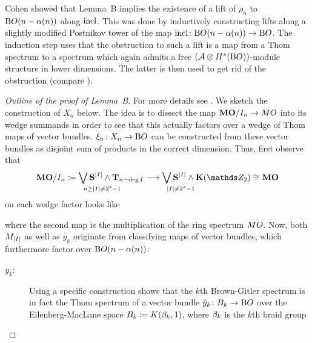 Cohen showed that Lemma~B implies the existence of a lift of $\rho_n$
to $\mathrm{B}O(n-\alpha(n))$ along $\mathrm{incl}$. This was done by inductively
constructing lifts along a slightly modified Postnikov tower of
the map $\mathrm{incl}\colon\mathrm{B}O(n-\alpha(n))\to\mathrm{B}O$.
The induction step uses that the obstruction to such a lift is
a map from a Thom spectrum to a spectrum which again admits a
free $(\mathcal{A}\otimes H^*(\mathrm{B}O))$-module structure in lower dimensions.
The latter is then used to get rid of the obstruction
(compare \cite[p.~118f]{immersionconj}).

\begin{proof}[Outline of the proof of Lemma~B]
  For more details see \cite[Chap.~III, §2]{immersionconj}.
  We sketch the construction of $X_n$ below.
  The idea is to dissect the map $\bm{\mathrm{MO}}/I_{n}\to MO$ into its
  wedge summands in order to see that this actually factors over a
  wedge of Thom maps of vector bundles.
  $\xi_n\colon X_n\to\mathrm{B}O$ can be constructed from these vector bundles
  as disjoint sum of products in the correct dimension.
  Thus, first observe that
  \begin{gather*}
    \MOmodI n
    \coloneqq
    \bigvee_{\mathrlap{n\geq\Deg{I}\neq 2^s-1}}
    \Spherespec{\Deg{I}} \smashprod \BrownGitler{n-\deg{I}}
    \longto
    \bigvee_{\mathrlap{\Deg{I}\neq 2^s-1}}
    \Spherespec{\Deg{I}} \smashprod  \EMspec
    \cong
    \MOspec
  \end{gather*}
  on each wedge factor looks like
  \begin{center}
  \end{center}
  where the second map is the multiplication of the ring spectrum
  $MO$.
  Now, both $M_{\left|I\right|}$ as well as $y_k$ originate
  from classifying maps of vector bundles, which furthermore factor
  over $\mathrm{B}O(n-\alpha(n))$:
  \begin{description}
  \item[$y_k$:]
    Using a specific construction shows that
    the $k$th Brown-Gitler spectrum is in fact the Thom spectrum of a
    vector bundle $\tilde y_k\colon B_{k}\to\mathrm{B}O$ over the
    Eilenberg-MacLane space $B_{k}\coloneqq K(\beta_{k},1)$,
    where $\beta_{k}$ is the $k$th braid group

\end{description}
\end{proof}

